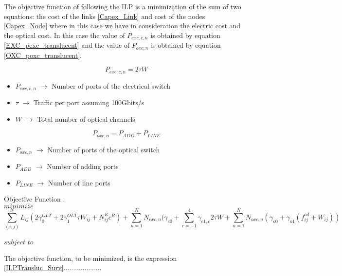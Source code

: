 The objective function of following the ILP is a minimization of the sum of two equations: the cost of the links \ref{Capex_Link} and cost of the nodes \ref{Capex_Node} where in this case we have in consideration the electric cost and the optical cost.
In this case the value of $P_{exc,c,n}$ is obtained by equation \ref{EXC_pexc_translucent} and the value of $P_{oxc,n}$ is obtained by equation \ref{OXC_poxc_translucent}.

\begin{equation}
P_{exc,c,n} = 2 \tau W
\label{EXC_pexc_translucent}
\end{equation}

\begin{itemize}
\item{$P_{exc,c,n}$	    $\rightarrow$	Number of ports of the electrical switch}
\item{$\tau$			$\rightarrow$	Traffic per port assuming 100Gbits/s}
\item{$W$				$\rightarrow$	Total number of optical channels}
\end{itemize}

\begin{equation}
P_{oxc,n} = P_{ADD} + P_{LINE}
\label{OXC_poxc_translucent}
\end{equation}
\begin{itemize}
\item{$P_{oxc,n}$	    $\rightarrow$	Number of ports of the optical switch}
\item{$P_{ADD}$			$\rightarrow$	Number of adding ports}
\item{$P_{LINE}$		$\rightarrow$	Number of line ports}
\end{itemize}

Objective Function :\\
$minimize$
\begin{equation}
\sum_{(i,j)}^N L_{ij} (2 \gamma_0^{OLT} + 2 \gamma_1^{OLT} \tau W_{ij} + N^R_{ij} c^R) + \sum_{n=1}^{N} N_{exc,n} (\gamma_{e0} + \sum_{c=-1}^4 \gamma_{e1,c} 2 \tau W + \sum_{n=1}^{N} N_{oxc,n} (\gamma_{o0} + \gamma_{o1}(f_{ij}^{od} + W_{ij}))
\label{ILPTransluc_surv}
\end{equation}


$subject$ $to$

\vspace{10pt}

The objective function, to be minimized, is the expression \ref{ILPTransluc_Surv}....................

